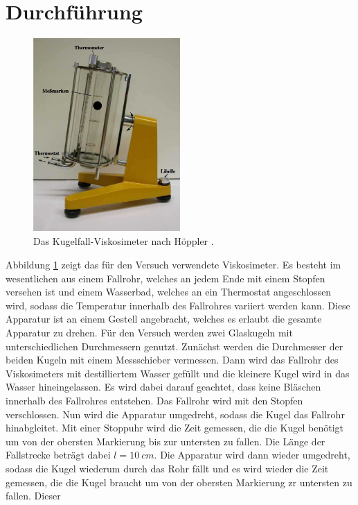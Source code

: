 \section{Durchführung}
\begin{figure}[h]
  \centering
  \includegraphics[width=0.5\textwidth]{assets/viskosimeter.png}
  \caption{Das Kugelfall-Viskosimeter nach Höppler \cite{V207}.}
  \label{fig:viskosimeter}
\end{figure}
\noindent Abbildung \ref{fig:viskosimeter} zeigt das für den Versuch verwendete Viskosimeter. Es besteht im wesentlichen aus einem Fallrohr, welches an jedem Ende mit einem Stopfen 
versehen ist und einem Wasserbad, welches an ein Thermostat angeschlossen wird, sodass die Temperatur innerhalb des Fallrohres variiert werden kann. Diese Apparatur ist an einem 
Gestell angebracht, welches es erlaubt die gesamte Apparatur zu drehen.
Für den Versuch werden zwei Glaskugeln mit unterschiedlichen Durchmessern genutzt. Zunächst werden die Durchmesser der beiden Kugeln mit einem Messschieber vermessen. Dann wird das 
Fallrohr des Viskosimeters mit destilliertem Wasser gefüllt und die kleinere Kugel wird in das Wasser hineingelassen. Es wird dabei darauf geachtet, dass keine Bläschen innerhalb des 
Fallrohres entstehen. Das Fallrohr wird mit den Stopfen verschlossen. Nun wird die Apparatur umgedreht, sodass die Kugel das Fallrohr hinabgleitet. Mit einer Stoppuhr wird die Zeit 
gemessen, die die Kugel benötigt um von der obersten Markierung bis zur untersten zu fallen. Die Länge der Fallstrecke beträgt dabei $l = \SI{10}{cm}$. Die Apparatur wird dann wieder 
umgedreht, sodass die Kugel wiederum durch das Rohr fällt und es wird wieder die Zeit gemessen, die die Kugel braucht um von der obersten Markierung zr untersten zu fallen. Dieser 
